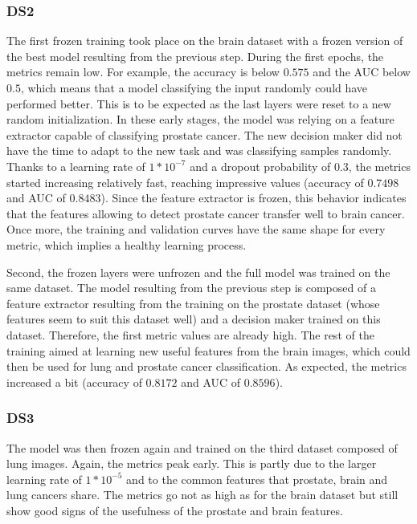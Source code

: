 \subsubsection{DS2}
\setlength{\marginparwidth}{3cm}\leavevmode {}The first frozen training took place on the brain dataset with a frozen version of the best model resulting from the previous step. During the first epochs, the metrics remain low. For example, the accuracy is below $0.575$ and the AUC below $0.5$, which means that a model classifying the input randomly could have performed better. This is to be expected as the last layers were reset to a new random initialization. In these early stages, the model was relying on a feature extractor capable of classifying prostate cancer. The new decision maker did not have the time to adapt to the new task and was classifying samples randomly. Thanks to a learning rate of $1*10^{-7}$ and a dropout probability of $0.3$, the metrics started increasing relatively fast, reaching impressive values (accuracy of $0.7498$ and AUC of $0.8483$). Since the feature extractor is frozen, this behavior indicates that the features allowing to detect prostate cancer transfer well to brain cancer. Once more, the training and validation curves have the same shape for every metric, which implies a healthy learning process.

Second, the frozen layers were unfrozen and the full model was trained on the same dataset. The model resulting from the previous step is composed of a feature extractor resulting from the training on the prostate dataset (whose features seem to suit this dataset well) and a decision maker trained on this dataset. Therefore, the first metric values are already high. The rest of the training aimed at learning new useful features from the brain images, which could then be used for lung and prostate cancer classification. As expected, the metrics increased a bit (accuracy of $0.8172$ and AUC of $0.8596$).

\subsubsection{DS3}
\setlength{\marginparwidth}{3cm}\leavevmode {}The model was then frozen again and trained on the third dataset composed of lung images. Again, the metrics peak early. This is partly due to the larger learning rate of $1*10^{-5}$ and to the common features that prostate, brain and lung cancers share. The metrics go not as high as for the brain dataset but still show good signs of the usefulness of the prostate and brain features.

